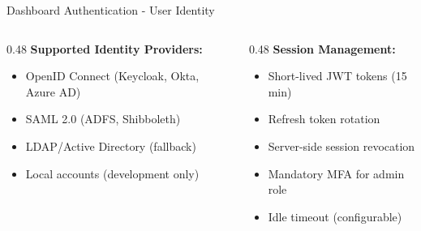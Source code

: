 \begin{frame}{Dashboard Authentication - User Identity}
  \scriptsize
  \begin{columns}[T]
    \begin{column}{0.48\textwidth}
      \textbf{Supported Identity Providers:}
      \begin{itemize}
        \item OpenID Connect (Keycloak, Okta, Azure AD)
        \item SAML 2.0 (ADFS, Shibboleth)
        \item LDAP/Active Directory (fallback)
        \item Local accounts (development only)
      \end{itemize}
    \end{column}
    \begin{column}{0.48\textwidth}
      \textbf{Session Management:}
      \begin{itemize}
        \item Short-lived JWT tokens (15 min)
        \item Refresh token rotation
        \item Server-side session revocation
        \item Mandatory MFA for admin role
        \item Idle timeout (configurable)
      \end{itemize}
    \end{column}
  \end{columns}
\end{frame}

